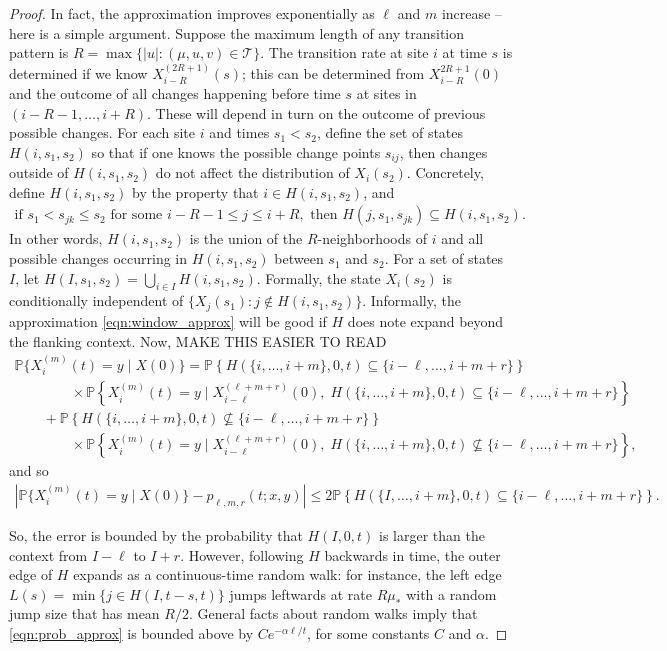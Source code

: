 \documentclass{article}
\renewcommand{\P}{\mathbb{P}}
\newcommand{\calT}{\mathcal{T}}  %
\newcommand{\st}{\colon}  %
\theoremstyle{plain}
\theoremstyle{definition}
\begin{document}
\begin{proof}

In fact, the approximation improves exponentially as $\ell$ and $m$ increase --
here is a simple argument.
Suppose the maximum length of any transition pattern is $R = \max\{ |u| : (\mu,u,v) \in \calT \}$.
The transition rate at site $i$ at time $s$ is determined if we know $X_{i-R}^{(2R+1)}(s)$;
this can be determined from $X_{i-R}^{2R+1}(0)$ and the outcome of all changes happening before time $s$ at sites in $(i-R-1, \ldots, i+R)$.
These will depend in turn on the outcome of previous possible changes.
For each site $i$ and times $s_1 < s_2$, define the set of states $H(i,s_1,s_2)$ 
so that if one knows the possible change points $s_{ij}$,
then changes outside of $H(i,s_1,s_2)$ do not affect the distribution of $X_i(s_2)$.
Concretely, define $H(i,s_1,s_2)$ by the property that $i \in H(i,s_1,s_2)$, and
\begin{gather}
  \text{if } s_1 < s_{jk} \le s_2 \text{ for some } i-R-1 \le j \le i+R, \text{ then } H(j,s_1,s_{jk}) \subseteq H(i,s_1,s_2) .
\end{gather}
In other words, $H(i,s_1,s_2)$ is the union of the $R$-neighborhoods of $i$ and all possible changes occurring in $H(i,s_1,s_2)$ between $s_1$ and $s_2$.
For a set of states $I$, let $H(I,s_1,s_2) = \bigcup_{i\in I} H(i,s_1,s_2)$.
Formally, the state $X_i(s_2)$ is conditionally independent of $\{X_j(s_1) \st j \notin H(i,s_1,s_2)\}$.
Informally, the approximation \eqref{eqn:window_approx} will be good if $H$ does note expand beyond the flanking context.
Now, MAKE THIS EASIER TO READ
\begin{multline}
  \P\{ X_i^{(m)}(t) = y \mid X(0) \} 
  = \P\left\{ H(\{i,\ldots,i+m\},0,t)\subseteq\{i-\ell,\ldots,i+m+r\} \right\} \\
   \qquad \qquad {} \times \P\left\{ X_i^{(m)}(t) = y \mid X_{i-\ell}^{(\ell+m+r)}(0), \; H(\{i,\ldots,i+m\},0,t)\subseteq\{i-\ell,\ldots,i+m+r\} \right\} \\
     \qquad {} + \P\left\{ H(\{i,\ldots,i+m\},0,t)\nsubseteq\{i-\ell,\ldots,i+m+r\} \right\}  \\
   \qquad\qquad {} \times \P\left\{ X_i^{(m)}(t) = y \mid X_{i-\ell}^{(\ell+m+r)}(0), \; H(\{i,\ldots,i+m\},0,t)\nsubseteq\{i-\ell,\ldots,i+m+r\} \right\} ,
\end{multline}
and so
\begin{align} \label{eqn:prob_approx}
  \left| \P\{ X_i^{(m)}(t) = y \mid X(0) \} - p_{\ell,m,r}(t;x,y) \right| \le 2 \P\left\{  H(\{I,\ldots,i+m\},0,t)\subseteq\{i-\ell,\ldots,i+m+r\} \right\}.
\end{align}

So, the error is bounded by the probability that $H(I,0,t)$ is larger than the context from $I-\ell$ to $I+r$.
However, following $H$ backwards in time, the outer edge of $H$ expands as a continuous-time random walk:
for instance, the left edge $L(s) = \min \{ j \in H(I,t-s,t) \}$ jumps leftwards at rate $R\mu_*$ with a random jump size
that has mean $R/2$.
General facts about random walks imply that \eqref{eqn:prob_approx} is bounded above by $C e^{-\alpha \ell/t}$, for some constants $C$ and $\alpha$.

\end{proof}
\end{document}
